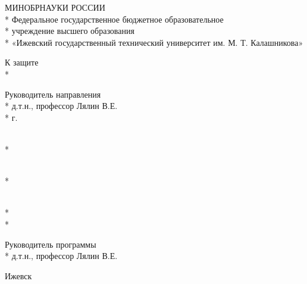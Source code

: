 \begin{titlepage}

\thispagestyle{empty}

\begin{center}
\large
МИНОБРНАУКИ РОССИИ\\*
Федеральное государственное бюджетное образовательное\\*
учреждение высшего образования\\*
«Ижевский государственный технический университет им. М. Т. Калашникова»
\vspace{1cm}
\end{center}

\hfill
\begin{minipage}{0.3\textwidth}
К защите\\*

Руководитель направления\\*
д.т.н., профессор Лялин В.Е.\\*
\text{\mydate} \text{\mymonth} \text{\myyear} г.
\end{minipage}

\vspace{6em}

\begin{center}
\textbf{\myfullname}\\*
\vspace{1em}
\titletext
\end{center}

\begin{center}
\myspeciality

\vspace{1em}

\textbf{\titletype}
\end{center}

\vspace{\fill}

\hfill
\begin{minipage}{0.3\textwidth}
\mylabel\\*
\myname

\vspace{1em}

\myteacherlabel\\*
\myteacherdegree\\*
\myteacher

\vspace{1em}

Руководитель программы\\*
д.т.н., профессор Лялин В.Е.

\vspace{1em}
\end{minipage}

\begin{center}
    Ижевск \myyear
\end{center}

\end{titlepage}

\setcounter{page}{2}
\pagestyle{plain}
